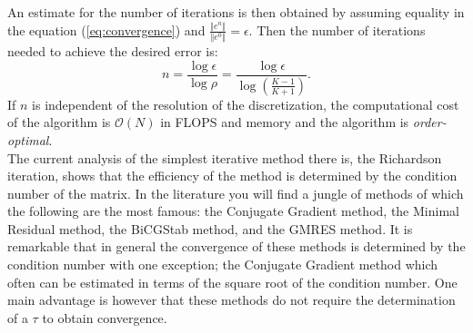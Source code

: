 An estimate for the number of iterations is then obtained by assuming
equality in the equation (\ref{eq:convergence}) and $\frac{\Vert e^n\Vert}
{\Vert e^0 \Vert} = \epsilon$. Then the number of iterations needed to achieve the 
desired error is:
\begin{equation}
\label{no_iterations}
n = \frac{\log \epsilon}{\log \rho} = \frac{\log \epsilon}{\log (\frac{K-1}{K+1})} .
\end{equation} 
If $n$ is independent of the resolution of the discretization, the computational cost of the algorithm is  $\mathcal{O}(N)$ in FLOPS and memory 
and the algorithm is \textit{order-optimal}. \\

The current analysis of the simplest iterative method there is, the Richardson iteration,  shows that the efficiency of the method 
is determined by the condition number of the matrix. In the literature you will find a jungle of
methods of which the following are the most famous: the Conjugate Gradient method, the Minimal Residual method, the BiCGStab method, and the GMRES method.  It is remarkable that in general the convergence of these methods is determined by the condition number with one exception; the Conjugate Gradient method which often can be estimated in terms of the square root of the condition number. One main advantage is however that these methods
do not require the determination of a $\tau$ to obtain convergence.    

